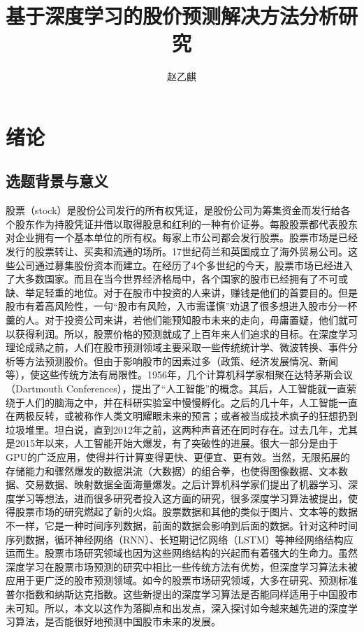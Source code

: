 \documentclass[UTF8]{ctexart}
\author{赵乙麒}
\title{基于深度学习的股价预测解决方法分析研究}
\begin{document}
\maketitle
\section{绪论}
\subsection{选题背景与意义}
股票（stock）是股份公司发行的所有权凭证，是股份公司为筹集资金而发行给各个股东作为持股凭证并借以取得股息和红利的一种有价证券。每股股票都代表股东对企业拥有一个基本单位的所有权。每家上市公司都会发行股票。股票市场是已经发行的股票转让、买卖和流通的场所。17世纪荷兰和英国成立了海外贸易公司。这些公司通过募集股份资本而建立。在经历了4个多世纪的今天，股票市场已经进入了大多数国家。而且在当今世界经济格局中，各个国家的股市已经拥有了不可或缺、举足轻重的地位。对于在股市中投资的人来讲，赚钱是他们的首要目的。但是股市有着高风险性，一句“股市有风险，入市需谨慎”劝退了很多想进入股市分一杯羹的人。对于投资公司来讲，若他们能预知股市未来的走向，毋庸置疑，他们就可以获得利润。所以，股票价格的预测就成了上百年来人们追求的目标。在深度学习理论成熟之前，人们在股市预测领域主要采取一些传统统计学、微波转换\cite{Ramsey1999}、事件分析\cite{Verma2017}等方法预测股价。但由于影响股市的因素过多（政策、经济发展情况、新闻等），使这些传统方法有局限性。1956年，几个计算机科学家相聚在达特茅斯会议（Dartmouth Conferences），提出了“人工智能”的概念。其后，人工智能就一直萦绕于人们的脑海之中，并在科研实验室中慢慢孵化。之后的几十年，人工智能一直在两极反转，或被称作人类文明耀眼未来的预言；或者被当成技术疯子的狂想扔到垃圾堆里。坦白说，直到2012年之前，这两种声音还在同时存在。过去几年，尤其是2015年以来，人工智能开始大爆发，有了突破性的进展\cite{LeCun2015,Schmidhuber2015}。很大一部分是由于GPU的广泛应用，使得并行计算变得更快、更便宜、更有效。当然，无限拓展的存储能力和骤然爆发的数据洪流（大数据）的组合拳，也使得图像数据、文本数据、交易数据、映射数据全面海量爆发。之后计算机科学家们提出了机器学习、深度学习等想法，进而很多研究者投入这方面的研究，很多深度学习算法被提出，使得股票市场的研究燃起了新的火焰。股票数据和其他的类似于图片、文本等的数据不一样，它是一种时间序列数据，前面的数据会影响到后面的数据。针对这种时间序列数据，循环神经网络（RNN）、长短期记忆网络（LSTM）等神经网络结构应运而生。股票市场研究领域也因为这些网络结构的兴起而有着强大的生命力。虽然深度学习在股票市场预测的研究中相比一些传统方法有优势，但深度学习算法未被应用于更广泛的股市预测领域。如今的股票市场研究领域，大多在研究、预测标准普尔指数和纳斯达克指数。这些新提出的深度学习算法是否能同样适用于中国股市未可知。所以，本文以这作为落脚点和出发点，深入探讨如今越来越先进的深度学习算法，是否能很好地预测中国股市未来的发展。
\end{document}
